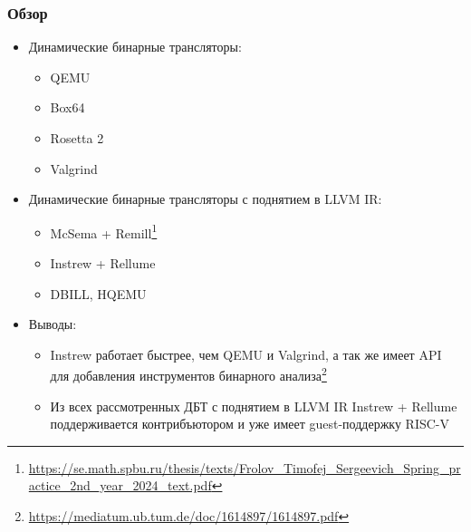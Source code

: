 \documentclass{beamer}
\begin{document}
\begin{frame}
  \frametitle{Обзор}
  \begin{itemize}
    \item Динамические бинарные трансляторы:
          \begin{itemize}
            \item QEMU
            \item Box64
            \item Rosetta 2
            \item Valgrind
          \end{itemize}
    \item Динамические бинарные трансляторы с поднятием в LLVM IR:
          \begin{itemize}
            \item McSema + Remill\footnote{\href{https://se.math.spbu.ru/thesis/texts/Frolov\_Timofej\_Sergeevich\_Spring\_practice\_2nd\_year\_2024\_text.pdf}{https://se.math.spbu.ru/thesis/texts/Frolov\_Timofej\_Sergeevich\_Spring\_practice\_2nd\_year\_2024\_text.pdf}}
            \item Instrew + Rellume
            \item DBILL, HQEMU
          \end{itemize}
    \item Выводы:
          \begin{itemize}
            \item Instrew работает быстрее, чем QEMU и Valgrind, а так же имеет API для добавления инструментов бинарного анализа\footnote{\href{https://mediatum.ub.tum.de/doc/1614897/1614897.pdf}{https://mediatum.ub.tum.de/doc/1614897/1614897.pdf}}
            \item Из всех рассмотренных ДБТ с поднятием в LLVM IR Instrew + Rellume поддерживается контрибъютором и уже имеет guest-поддержку RISC-V
          \end{itemize}
  \end{itemize}
\end{frame}

\end{document}
